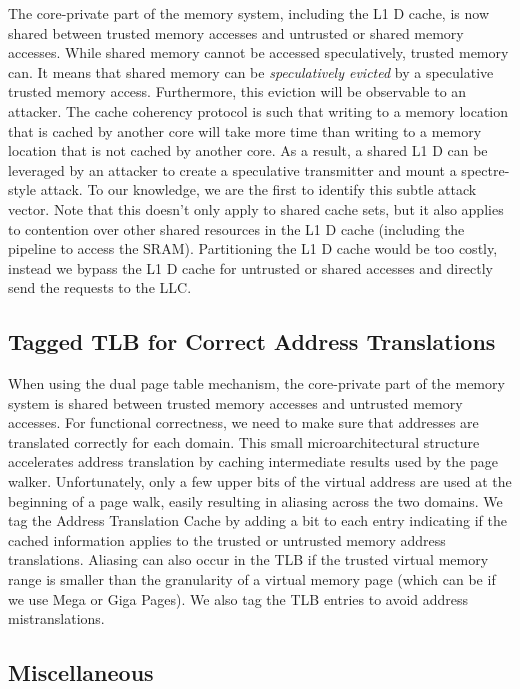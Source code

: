 The core-private part of the memory system, including the L1 D cache, is now shared between trusted memory accesses and untrusted or shared memory accesses.
While shared memory cannot be accessed speculatively, trusted memory can.
It means that shared memory can be \emph{speculatively evicted} by a speculative trusted memory access.
Furthermore, this eviction will be observable to an attacker.
The cache coherency protocol is such that writing to a memory location that is cached by another core will take more time than writing to a memory location that is not cached by another core.
As a result, a shared L1 D can be leveraged by an attacker to create a speculative transmitter and mount a spectre-style attack.
To our knowledge, we are the first to identify this subtle attack vector.
Note that this doesn't only apply to shared cache sets, but it also applies to contention over other shared resources in the L1 D cache (including the pipeline to access the SRAM).
Partitioning the L1 D cache would be too costly, instead we bypass the L1 D cache for untrusted or shared accesses and directly send the requests to the LLC.

\subsection{Tagged TLB for Correct Address Translations} 

When using the dual page table mechanism, the core-private part of the memory system is shared between trusted memory accesses and untrusted memory accesses.
For functional correctness, we need to make sure that addresses are translated correctly for each domain.
This small microarchitectural structure accelerates address translation by caching intermediate results used by the page walker.
Unfortunately, only a few upper bits of the virtual address are used at the beginning of a page walk, easily resulting in aliasing across the two domains.
We tag the Address Translation Cache by adding a bit to each entry indicating if the cached information applies to the trusted or untrusted memory address translations.
Aliasing can also occur in the TLB if the trusted virtual memory range is smaller than the granularity of a virtual memory page (which can be if we use Mega or Giga Pages). 
We also tag the TLB entries to avoid address mistranslations.

\subsection{Miscellaneous}

